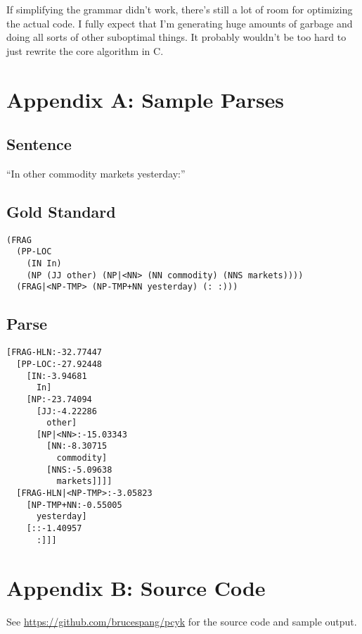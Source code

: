 \documentclass{article}
\begin{document}
If simplifying the grammar didn't work, there's still a lot of room for optimizing the actual code. I fully expect that I'm generating huge amounts of garbage and doing all sorts of other suboptimal things. It probably wouldn't be too hard to just rewrite the core algorithm in C.

\pagebreak

\section*{Appendix A: Sample Parses}

\subsection*{Sentence}

``In other commodity markets yesterday:''

\subsection*{Gold Standard}
\begin{verbatim}
(FRAG
  (PP-LOC
    (IN In)
    (NP (JJ other) (NP|<NN> (NN commodity) (NNS markets))))
  (FRAG|<NP-TMP> (NP-TMP+NN yesterday) (: :)))
\end{verbatim}

\subsection*{Parse}
\begin{verbatim}
[FRAG-HLN:-32.77447
  [PP-LOC:-27.92448
    [IN:-3.94681
      In]
    [NP:-23.74094
      [JJ:-4.22286
        other]
      [NP|<NN>:-15.03343
        [NN:-8.30715
          commodity]
        [NNS:-5.09638
          markets]]]]
  [FRAG-HLN|<NP-TMP>:-3.05823
    [NP-TMP+NN:-0.55005
      yesterday]
    [::-1.40957
      :]]]
\end{verbatim}

\section*{Appendix B: Source Code}

See \url{https://github.com/brucespang/pcyk} for the source code and sample output.
\end{document}
